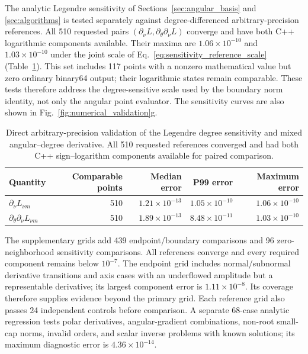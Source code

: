 ﻿\documentclass[11pt,a4paper]{article}
\begin{document}
The analytic Legendre sensitivity of Sections~\ref{sec:angular_basis} and \ref{sec:algorithms} is tested separately against degree-differenced arbitrary-precision references. All 510 requested pairs $(\partial_\nu L,\partial_\theta\partial_\nu L)$ converge and have both C++ logarithmic components available. Their maxima are $1.06\times10^{-10}$ and $1.03\times10^{-10}$ under the joint scale of Eq.~\eqref{eq:sensitivity_reference_scale} (Table~\ref{tab:degree_sensitivity_results}). This set includes 117 points with a nonzero mathematical value but zero ordinary binary64 output; their logarithmic states remain comparable. These tests therefore address the degree-sensitive scale used by the boundary norm identity, not only the angular point evaluator. The sensitivity curves are also shown in Fig.~\ref{fig:numerical_validation}g.

\begin{table}[!htbp]
\centering
\small
\caption{Direct arbitrary-precision validation of the Legendre degree sensitivity and mixed angular--degree derivative. All 510 requested references converged and had both C++ sign--logarithm components available for paired comparison.}
\label{tab:degree_sensitivity_results}
\begin{tabular}{lrrrr}
\toprule
Quantity & Comparable points & Median error & P99 error & Maximum error\\
\midrule
$\partial_\nu L_{\nu m}$ & 510 & $1.21\times10^{-13}$ & $1.05\times10^{-10}$ & $1.06\times10^{-10}$\\
$\partial_\theta\partial_\nu L_{\nu m}$ & 510 & $1.89\times10^{-13}$ & $8.48\times10^{-11}$ & $1.03\times10^{-10}$\\
\bottomrule
\end{tabular}
\end{table}

The supplementary grids add 439 endpoint/boundary comparisons and 96 zero-neighborhood sensitivity comparisons. All references converge and every required component remains below $10^{-7}$. The endpoint grid includes normal/subnormal derivative transitions and axis cases with an underflowed amplitude but a representable derivative; its largest component error is $1.11\times10^{-8}$. Its coverage therefore supplies evidence beyond the primary grid. Each reference grid also passes 24 independent controls before comparison. A separate 68-case analytic regression tests polar derivatives, angular-gradient combinations, non-root small-cap norms, invalid orders, and scalar inverse problems with known solutions; its maximum diagnostic error is $4.36\times10^{-14}$.
\end{document}
